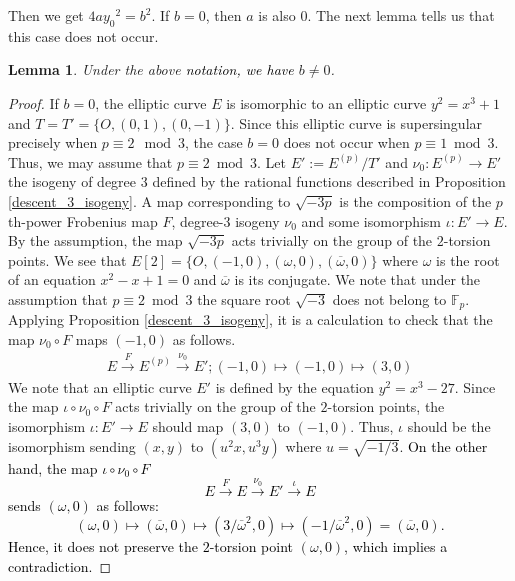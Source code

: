\documentclass[a4paper, 11pt]{article}
\theoremstyle{plain}
\newtheorem{lem}[defn]{Lemma}
\newcommand{\?}{\textcolor{red}{??}}
\newcommand{\fp}{\mathbb{F}_p}
\begin{document}
Then we get  $4a{y_0}^2=b^2$. If $b=0$, then $a$ is also $0$. The next lemma tells us that this case does not occur.
\begin{lem}
    Under the above \textcolor{black}{notation, we have} $b\ne0$.
\end{lem}
\begin{proof}
    If $b =0$, the elliptic curve $E$ is isomorphic to an elliptic curve $y^2=x^3+1$ and $T=T'=\{O,(0,1),(0,-1)\}$. Since this elliptic curve is supersingular precisely when $p \equiv 2 \mod 3$, the case $b=0$ does not occur when $p \equiv 1 \bmod 3.$
    Thus, we may assume that $p \equiv 2 \bmod 3$.  Let $E':=E^{(p)}/T'$ and $\nu_0:E^{(p)}\rightarrow E'$ the isogeny of degree $3$ defined by the rational functions described in Proposition \ref{descent_3_isogeny}. A map corresponding to $\sqrt{-3p}$ is the composition of the $p$ th-power Frobenius map $F$, degree-$3$ isogeny $\nu_0$ and some isomorphism $\iota :E'\rightarrow E$. By the assumption, the map $\sqrt{-3p}$ acts trivially on the group of the $2$-torsion points. We see that $E[2]=\{O,(-1,0),(\omega,0),(\overline{\omega},0)\}$ where $\omega$ is the root of an equation $x^2-x+1=0$ and $\overline{\omega}$ is its conjugate. We note that under the assumption that $p \equiv2 \bmod 3$ the square root $\sqrt{-3}$ does not belong to $\fp$. Applying Proposition \ref{descent_3_isogeny}, it is a calculation to check that the map $\nu_0\circ F$ maps $(-1,0)$ as follows.
\begin{align*}
 E \overset{F}{\longrightarrow} E^{(p)} \overset{\nu_0}{\longrightarrow} E';
 (-1,0) \mapsto (-1,0) \mapsto (3,0)  
\end{align*}
We note that an elliptic curve $E'$ is defined by the equation $y^2=x^3-27$. Since the map $\iota \circ \nu_0 \circ F$ acts trivially on the group of the $2$-torsion points, the isomorphism $\iota:E'\rightarrow E$ should map $(3,0)$ to $(-1,0)$. Thus, $\iota$ should be the isomorphism sending $(x,y) $ to $(u^2x,u^3y)$ where $u=\sqrt{-1/3}$. \textcolor{black}{On the other hand, the map $\iota \circ \nu_0\circ F$
\[
E \overset{F}{\longrightarrow} E \overset{\nu_0}{\longrightarrow} E'\overset{\iota}{\longrightarrow} E
\]
sends $(\omega,0)$ as follows:
\[
 (\omega,0)\mapsto (\overline{\omega},0) \mapsto (3/{\overline{\omega}}^2,0) \mapsto  (-1/{\overline{\omega}}^2,0)= (\overline{\omega},0).
\]
Hence, it does not preserve the $2$-torsion point $(\omega,0)$, which implies a contradiction.}
\end{proof}
\end{document}
